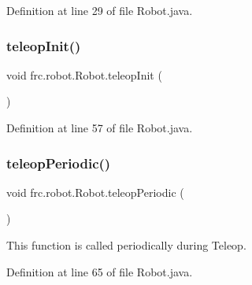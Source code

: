 Definition at line 29 of file Robot.\+java.

\mbox{\label{classfrc_1_1robot_1_1_robot_a209dbf07bfec75d73fa53126a8e31b88}} 
\subsubsection{\texorpdfstring{teleop\+Init()}{teleopInit()}}
{\footnotesize\ttfamily void frc.\+robot.\+Robot.\+teleop\+Init (\begin{DoxyParamCaption}{ }\end{DoxyParamCaption})}



Definition at line 57 of file Robot.\+java.

\mbox{\label{classfrc_1_1robot_1_1_robot_ae807171661cbc29081bc10f06d6831e7}} 
\subsubsection{\texorpdfstring{teleop\+Periodic()}{teleopPeriodic()}}
{\footnotesize\ttfamily void frc.\+robot.\+Robot.\+teleop\+Periodic (\begin{DoxyParamCaption}{ }\end{DoxyParamCaption})}



This function is called periodically during Teleop. 



Definition at line 65 of file Robot.\+java.

